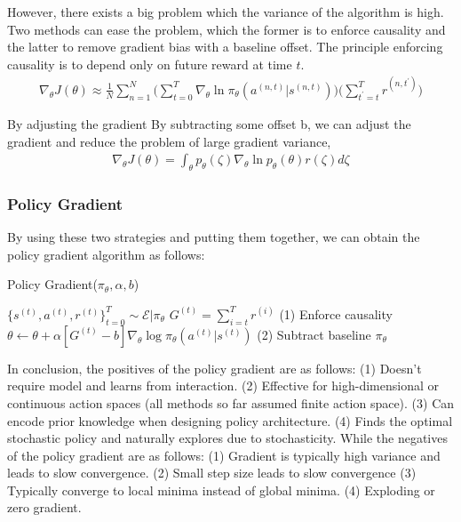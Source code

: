 \documentclass[11pt]{article}
\begin{document}
However, there exists a big problem which the variance of the algorithm is high. Two methods can ease the problem, which the former is to enforce causality and the latter to remove gradient bias with a baseline offset.
%
The principle enforcing causality is to depend only on future reward at time $t$.
\begin{align*}
    \nabla_\theta J(\theta) \approx \frac{1}{N}\sum_{n=1}^N \Bigg( \sum_{t=0}^T \nabla_\theta \ln \pi_\theta(a^{(n, t)}|s^{(n, t)}) \Bigg) \Bigg( \sum_{t^{'}=t}^T r^{(n, t^{'})} \Bigg)
\end{align*}

By adjusting the gradient By subtracting some offset b, we can adjust the gradient and reduce the problem of large gradient variance,
\begin{align*}
    \nabla_\theta J(\theta)= \int_\theta p_\theta(\zeta) \nabla_\theta \ln p_\theta(\theta)r(\zeta)d\zeta
\end{align*}

\subsubsection{Policy Gradient}
By using these two strategies and putting them together, we can obtain the policy gradient algorithm as follows:
\begin{algorithm}[H]
\caption{Policy Gradient($\pi_\theta, \alpha, b$)}
\begin{algorithmic}[1]
\STATE $\{s^{(t)}, a^{(t)}, r^{(t)}\}_{t=0}^T \sim \mathcal{E}|\pi_\theta$
\STATE $G^{(t)} = \sum_{i=t}^T r^{(i)}$  \hfill (1) Enforce causality
\STATE $\theta \leftarrow \theta + \alpha [G^{(t)}-b] \nabla_\theta \log \pi_\theta (a^{(t)}|s^{(t)}) $ \hfill (2) Subtract baseline
\ENDFOR
\ENDFOR
\RETURN $\pi_\theta$
\end{algorithmic}
\end{algorithm}
In conclusion, the positives of the policy gradient are as follows: (1) Doesn't require model and learns from interaction. (2) Effective for high-dimensional or continuous action spaces (all methods so far assumed finite action space). (3) Can encode prior knowledge when designing policy architecture. (4) Finds the optimal stochastic policy and naturally explores due to stochasticity.
%
While the negatives of the policy gradient are as follows: (1) Gradient is typically high variance and leads to slow convergence. (2) Small step size leads to slow convergence (3) Typically converge to local minima instead of global minima. (4) Exploding or zero gradient.
\end{document}
